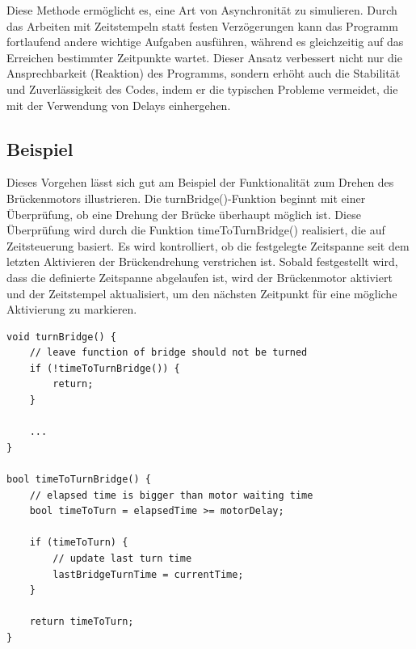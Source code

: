Diese Methode ermöglicht es, eine Art von Asynchronität zu simulieren. Durch das Arbeiten mit Zeitstempeln statt festen Verzögerungen kann das Programm fortlaufend andere wichtige Aufgaben ausführen, während es gleichzeitig auf das Erreichen bestimmter Zeitpunkte wartet. Dieser Ansatz verbessert nicht nur die Ansprechbarkeit (Reaktion) des Programms, sondern erhöht auch die Stabilität und Zuverlässigkeit des Codes, indem er die typischen Probleme vermeidet, die mit der Verwendung von Delays einhergehen.

\subsection{Beispiel}

Dieses Vorgehen lässt sich gut am Beispiel der Funktionalität zum Drehen des Brückenmotors illustrieren. Die turnBridge()-Funktion beginnt mit einer Überprüfung, ob eine Drehung der Brücke überhaupt möglich ist. Diese Überprüfung wird durch die Funktion timeToTurnBridge() realisiert, die auf Zeitsteuerung basiert. Es wird kontrolliert, ob die festgelegte Zeitspanne seit dem letzten Aktivieren der Brückendrehung verstrichen ist. Sobald festgestellt wird, dass die definierte Zeitspanne abgelaufen ist, wird der Brückenmotor aktiviert und der Zeitstempel aktualisiert, um den nächsten Zeitpunkt für eine mögliche Aktivierung zu markieren.

\begin{minipage}{\linewidth}
\begin{lstlisting}[caption={Zeitgesteuertes Drehen des Brückenmotors},captionpos=b]
void turnBridge() {
    // leave function of bridge should not be turned
    if (!timeToTurnBridge()) {
        return;
    }
    
    ...
}

bool timeToTurnBridge() {
    // elapsed time is bigger than motor waiting time
    bool timeToTurn = elapsedTime >= motorDelay;

    if (timeToTurn) {
        // update last turn time
        lastBridgeTurnTime = currentTime;
    }

    return timeToTurn;
}
\end{lstlisting}
\end{minipage}